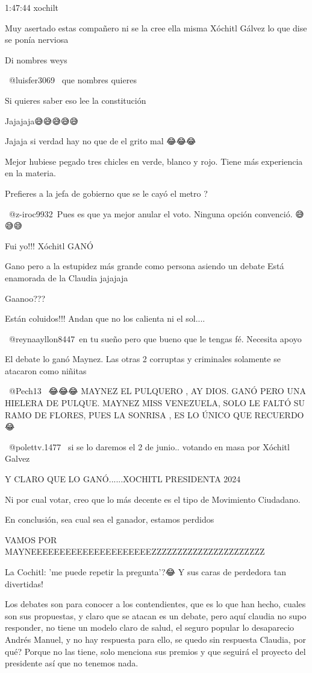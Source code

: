 1:47:44 xochilt

Muy asertado estas compañero ni se la cree ella misma Xóchitl Gálvez lo que dise se ponía nerviosa

Di nombres weys

 @luisfer3069  que nombres quieres

Si quieres saber eso lee la constitución

Jajajaja😅😅😅😅😅

Jajaja si verdad hay no que de el grito mal 😂😂😂

Mejor hubiese pegado tres chicles en verde, blanco y rojo. Tiene más experiencia en la materia.

Prefieres a la jefa de gobierno que se le cayó el metro ? 🤡

 @z-iroc9932 Pues es que ya mejor anular el voto. Ninguna opción convenció. 😅😅😅

Fui yo!!! Xóchitl GANÓ 🩷🩷🩷🩷

Gano pero a la estupidez más grande como persona asiendo un debate 
Está enamorada de la Claudia jajajaja

Gaanoo???

Están coluidos!!! Andan que no los calienta ni el sol....

​ @reynaayllon8447 en tu sueño pero que bueno que le tengas fé. Necesita apoyo

El debate lo ganó Maynez. Las otras 2 corruptas y criminales solamente se atacaron como niñitas

​ @Pech13  😂😂😂 MAYNEZ EL PULQUERO , AY DIOS.
GANÓ PERO UNA HIELERA DE PULQUE.
MAYNEZ MISS VENEZUELA, SOLO LE FALTÓ SU RAMO DE FLORES, PUES LA SONRISA , ES LO ÚNICO QUE RECUERDO 😂

 @polettv.1477  si se lo daremos el 2 de junio.. votando en masa por Xóchitl Galvez 🤞🤞🏻🤞🤞🏻🤞🤞🏻

Y CLARO QUE LO GANÓ......XOCHITL PRESIDENTA 2024

Ni por cual votar, creo que lo más decente es el tipo de Movimiento Ciudadano.

En conclusión, sea cual sea el ganador, estamos perdidos

VAMOS POR MAYNEEEEEEEEEEEEEEEEEEEEEZZZZZZZZZZZZZZZZZZZZZZ

La Cochitl: 'me puede repetir la pregunta'?😂
Y sus caras de perdedora tan divertidas!🤣

Los debates son para conocer a los contendientes, que es lo que han hecho, cuales son sus propuestas, y claro que se atacan es un debate, pero aquí claudia no supo responder, no tiene un modelo claro de salud, el seguro popular lo desaparecio Andrés Manuel, y no hay respuesta para ello, se quedo sin respuesta Claudia, por qué? Porque no las tiene, solo menciona sus premios y que seguirá el proyecto del presidente así que no tenemos nada.

